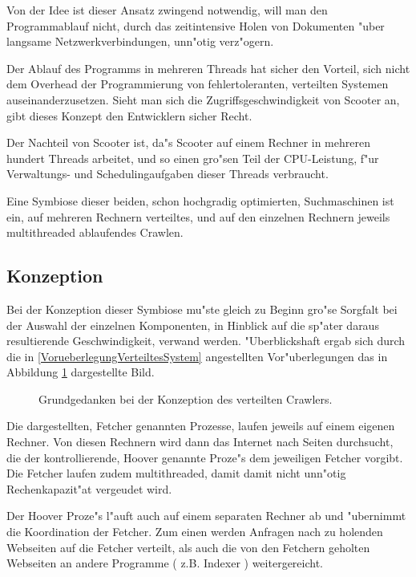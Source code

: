 Von der Idee ist dieser Ansatz zwingend notwendig, will man den Programmablauf nicht, durch das zeitintensive Holen von Dokumenten "uber langsame Netzwerkverbindungen, unn"otig verz"ogern.

Der Ablauf des Programms in mehreren Threads hat sicher den Vorteil, sich nicht dem Overhead der Programmierung von fehlertoleranten, verteilten Systemen auseinanderzusetzen. Sieht man sich die Zugriffsgeschwindigkeit von Scooter an, gibt dieses Konzept den Entwicklern sicher Recht.

Der Nachteil von Scooter ist, da"s Scooter auf einem Rechner in mehreren hundert Threads arbeitet, und so einen gro"sen Teil der CPU-Leistung, f"ur Verwaltungs- und Schedulingaufgaben dieser Threads verbraucht.

Eine Symbiose dieser beiden, schon hochgradig optimierten, Suchmaschinen ist ein, auf mehreren Rechnern verteiltes, und auf den einzelnen Rechnern jeweils multithreaded ablaufendes Crawlen.



\subsection{Konzeption}
Bei der Konzeption dieser Symbiose mu"ste gleich zu Beginn gro"se Sorgfalt bei der Auswahl der einzelnen Komponenten, in Hinblick auf die sp"ater daraus resultierende Geschwindigkeit, verwand werden. "Uberblickshaft ergab sich durch die in \ref{VorueberlegungVerteiltesSystem}
angestellten Vor"uberlegungen das in Abbildung \ref{HooverErsterUeberblick} dargestellte Bild.

\begin{figure}[t]
	\caption{Grundgedanken bei der Konzeption des verteilten Crawlers.}
	\label{HooverErsterUeberblick}
\end{figure}


Die dargestellten, Fetcher genannten Prozesse, laufen jeweils auf einem eigenen Rechner. Von diesen Rechnern wird dann das Internet nach Seiten durchsucht, die der kontrollierende, Hoover genannte Proze"s dem jeweiligen Fetcher vorgibt. Die Fetcher laufen zudem multithreaded, damit damit nicht unn"otig Rechenkapazit"at vergeudet wird.

Der Hoover Proze"s l"auft auch auf einem separaten Rechner ab und "ubernimmt die Koordination der Fetcher. Zum einen werden Anfragen nach zu holenden Webseiten auf die Fetcher verteilt, als auch die von den Fetchern geholten Webseiten an andere Programme ( z.B. Indexer ) weitergereicht.

